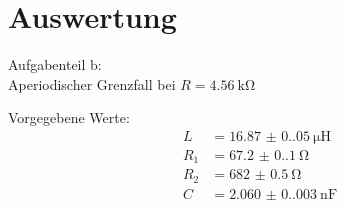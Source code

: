 \section{Auswertung}
\label{sec:Auswertung}

Aufgabenteil b:\\
Aperiodischer Grenzfall bei $R = \SI{4.56}{\kilo\ohm}$

Vorgegebene Werte:
\begin{align*}
  L &= \SI{16.87(0.05)}{\micro\henry} \\
  R_1 &= \SI{67.2(0.1)}{\ohm}\\
  R_2 &= \SI{682(0.5)}{\ohm}\\
  C &= \SI{2.060(0.003)}{\nano\farad}
\end{align*}